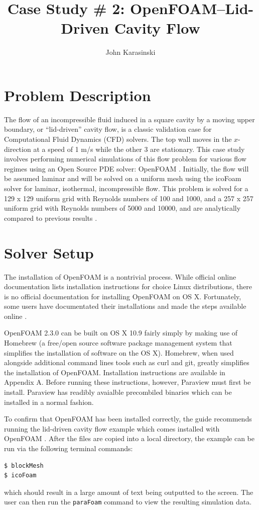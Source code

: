 \documentclass[twocolumn,10pt]{asme2ej}
\title{Case Study \# 2: OpenFOAM–Lid-Driven Cavity Flow}
\author{John Karasinski
    \affiliation{
  Graduate Student Researcher\\
  Center for Human/Robotics/Vehicle Integration and Performance\\
  Department of Mechanical and Aerospace Engineering\\
  University of California\\
  Davis, California 95616\\
    Email: karasinski@ucdavis.edu
    }
}
\begin{document}
\maketitle

\section{Problem Description}
The flow of an incompressible fluid induced in a square cavity by a moving upper boundary, or ``lid-driven'' cavity flow, is a classic validation case for Computational Fluid Dynamics (CFD) solvers. The top wall moves in the $x$-direction at a speed of 1 m/s while the other 3 are stationary. This case study involves performing numerical simulations of this flow problem for various flow regimes using an Open Source PDE solver: OpenFOAM \cite{jasak2007openfoam}. Initially, the flow will be assumed laminar and will be solved on a uniform mesh using the icoFoam solver for laminar, isothermal, incompressible flow. This problem is solved for a 129 x 129 uniform grid with Reynolds numbers of 100 and 1000, and a 257 x 257 uniform grid with Reynolds numbers of 5000 and 10000, and are analytically compared to previous results \cite{ghia1982high}.

\section{Solver Setup}
The installation of OpenFOAM is a nontrivial process. While official online documentation lists installation instructions for choice Linux distributions, there is no official documentation for installing OpenFOAM on OS X. Fortunately, some users have documentated their installations and made the steps available online \cite{ctfm_1}.

OpenFOAM 2.3.0 can be built on OS X 10.9 fairly simply by making use of Homebrew (a free/open source software package management system that simplifies the installation of software on the OS X). Homebrew, when used alongside additional command lines tools such as curl and git, greatly simplifies the installation of OpenFOAM. Installation instructions are available in Appendix A. Before running these instructions, however, Paraview must first be install. Paraview has readibly avaialble precombiled binaries which can be installed in a normal fashion.

To confirm that OpenFOAM has been installed correctly, the guide recommends running the lid-driven cavity flow example which comes installed with OpenFOAM \cite{ctfm_1}. After the files are copied into a local directory, the example can be run via the following terminal commands:
\begin{lstlisting}[language=sh]
$ blockMesh
$ icoFoam
\end{lstlisting}
which should result in a large amount of text being outputted to the screen. The user can then run the \lstinline[language=sh]`paraFoam` command to view the resulting simulation data.
\end{document}
